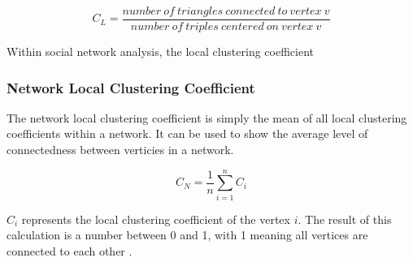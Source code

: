 \begin{equation}
C_L = \frac{number\: of\: triangles\: connected\: to\: vertex\: v}{number\: of\: triples\: centered\: on\: vertex\: v}
\label{eq:localcc}
\end{equation}

Within social network analysis, the local clustering coefficient

\subsubsection{Network Local Clustering Coefficient}
The network local clustering coefficient is simply the mean of all local clustering coefficients within a network. It can be used to show the average level of connectedness between verticies in a network.

\begin{equation}
C_N = \frac{1}{n}\sum_{i=1}^{n} C_i
\label{eq:networkcc}
\end{equation}

$C_i$ represents the local clustering coefficient of the vertex $i$. The result of this calculation is a number between 0 and 1, with 1 meaning all vertices are connected to each other \cite{watts98}.
